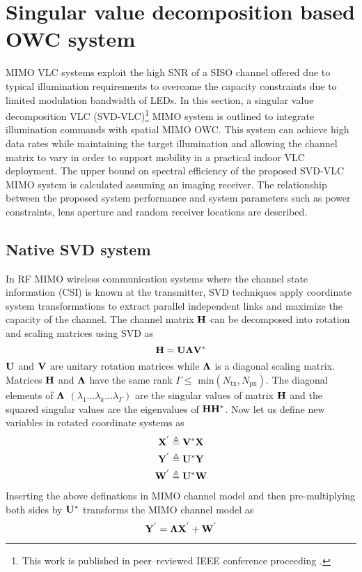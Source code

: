 \section{Singular value decomposition based OWC system}
\label{sec:svdvlc}
\graphicspath{{_System/figures_svdvlc/}}

MIMO VLC systems exploit the high SNR of a SISO channel offered due to typical illumination requirements to overcome the capacity constraints due to limited modulation bandwidth of LEDs. In this section, a singular value decomposition VLC (SVD-VLC)\footnote{This work is published in peer--reviewed IEEE conference proceeding \cite{but13a}.} MIMO system is outlined to integrate illumination commands with spatial MIMO OWC. This system can achieve high data rates while maintaining the target illumination and allowing the channel matrix to vary in order to support mobility in a practical indoor VLC deployment. The upper bound on spectral efficiency of the proposed SVD-VLC MIMO system is calculated assuming an imaging receiver. The relationship between the proposed system performance and system parameters such as power constraints, lens aperture and random receiver locations are described.

\subsection{Native SVD system}
\label{subsec:svdvlcNative}
In RF MIMO wireless communication systems where the channel state information (CSI) is known at the transmitter, SVD techniques apply coordinate system transformations to extract parallel independent links and maximize the capacity of the channel. The channel matrix $\bf{H}$ can be decomposed into rotation and scaling matrices using SVD as 
\begin{equation}
	\label{eqHsvd}
	\bf{H} = \bf{U}\bf{\Lambda}\bf{V}^{*}
\end{equation}
$\bf{U}$ and $\bf{V}$ are unitary rotation matrices while $\bf{\Lambda}$ is a diagonal scaling matrix. Matrices $\bf{H}$ and $\bf{\Lambda}$ have the same rank $\Gamma\leq$ min$(N_{\text{tx}},N_{\text{px}})$. The diagonal elements of $\bf{\Lambda}$ $(\lambda_{1}...\lambda_{k}...\lambda_{\Gamma})$ are the singular values of matrix $\bf{H}$ and the squared singular values are the eigenvalues of ${\bf{H}}{\bf{H}}^{*}$. Now let us define new variables in rotated coordinate systems as
\begin{gather}
	\bf{X}^{'} \triangleq \bf{V}^{*}\bf{X}\\
	\bf{Y}^{'} \triangleq \bf{U}^{*}\bf{Y}\\
	\bf{W}^{'} \triangleq \bf{U}^{*}\bf{W}
\end{gather}
Inserting the above definations in MIMO channel model and then pre-multiplying both sides by $\bf{U}^{*}$ transforms the MIMO channel model as
\begin{equation}
	\label{eqSVDChannel}
	\bf{Y}^{'} = \bf{\Lambda}\bf{X}^{'} + \bf{W}^{'}
\end{equation}

